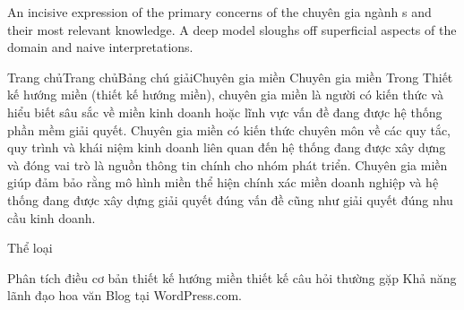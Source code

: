 An incisive expression of the primary concerns of the chuyên gia ngành s and their most relevant knowledge. A deep model sloughs off superficial aspects of the domain and naive interpretations.

Trang chủTrang chủBảng chú giảiChuyên gia miền
Chuyên gia miền
Trong Thiết kế hướng miền (thiết kế hướng miền), chuyên gia miền là người có kiến thức và hiểu biết sâu sắc về miền kinh doanh hoặc lĩnh vực vấn đề đang được hệ thống phần mềm giải quyết. Chuyên gia miền có kiến thức chuyên môn về các quy tắc, quy trình và khái niệm kinh doanh liên quan đến hệ thống đang được xây dựng và đóng vai trò là nguồn thông tin chính cho nhóm phát triển. Chuyên gia miền giúp đảm bảo rằng mô hình miền thể hiện chính xác miền doanh nghiệp và hệ thống đang được xây dựng giải quyết đúng vấn đề cũng như giải quyết đúng nhu cầu kinh doanh.

Thể loại

Phân tích
điều cơ bản
thiết kế hướng miền
thiết kế
câu hỏi thường gặp
Khả năng lãnh đạo
hoa văn
Blog tại WordPress.com.